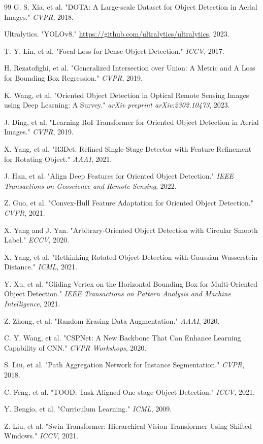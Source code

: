 \documentclass[12pt, a4paper]{report}
\begin{document}
\newpage
\begin{thebibliography}{99}
    G. S. Xia, et al. "DOTA: A Large-scale Dataset for Object Detection in Aerial Images." \textit{CVPR}, 2018.

    Ultralytics. "YOLOv8." \url{https://github.com/ultralytics/ultralytics}, 2023.

    T. Y. Lin, et al. "Focal Loss for Dense Object Detection." \textit{ICCV}, 2017.

    H. Rezatofighi, et al. "Generalized Intersection over Union: A Metric and A Loss for Bounding Box Regression." \textit{CVPR}, 2019.
    
    K. Wang, et al. "Oriented Object Detection in Optical Remote Sensing Images using Deep Learning: A Survey." \textit{arXiv preprint arXiv:2302.10473}, 2023.

    J. Ding, et al. "Learning RoI Transformer for Oriented Object Detection in Aerial Images." \textit{CVPR}, 2019.

    X. Yang, et al. "R3Det: Refined Single-Stage Detector with Feature Refinement for Rotating Object." \textit{AAAI}, 2021.

    J. Han, et al. "Align Deep Features for Oriented Object Detection." \textit{IEEE Transactions on Geoscience and Remote Sensing}, 2022.

    Z. Guo, et al. "Convex-Hull Feature Adaptation for Oriented Object Detection." \textit{CVPR}, 2021.
    
    X. Yang and J. Yan. "Arbitrary-Oriented Object Detection with Circular Smooth Label." \textit{ECCV}, 2020.

    X. Yang, et al. "Rethinking Rotated Object Detection with Gaussian Wasserstein Distance." \textit{ICML}, 2021.

    Y. Xu, et al. "Gliding Vertex on the Horizontal Bounding Box for Multi-Oriented Object Detection." \textit{IEEE Transactions on Pattern Analysis and Machine Intelligence}, 2021.

    Z. Zhong, et al. "Random Erasing Data Augmentation." \textit{AAAI}, 2020.

    C. Y. Wang, et al. "CSPNet: A New Backbone That Can Enhance Learning Capability of CNN." \textit{CVPR Workshops}, 2020.

    S. Liu, et al. "Path Aggregation Network for Instance Segmentation." \textit{CVPR}, 2018.

    C. Feng, et al. "TOOD: Task-Aligned One-stage Object Detection." \textit{ICCV}, 2021.

    Y. Bengio, et al. "Curriculum Learning." \textit{ICML}, 2009.

    Z. Liu, et al. "Swin Transformer: Hierarchical Vision Transformer Using Shifted Windows." \textit{ICCV}, 2021.
\end{thebibliography}
\end{document}
